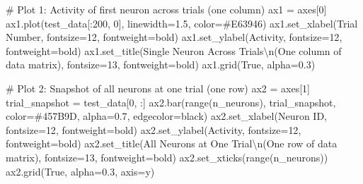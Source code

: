 \documentclass[
  11pt,
  letterpaper,
  oneside,
  openany]{book}
\newenvironment{Shaded}{\begin{snugshade}}{\end{snugshade}}
\newcommand{\BuiltInTok}[1]{\textcolor[rgb]{0.00,0.23,0.31}{#1}}
\newcommand{\CharTok}[1]{\textcolor[rgb]{0.13,0.47,0.30}{#1}}
\newcommand{\CommentTok}[1]{\textcolor[rgb]{0.37,0.37,0.37}{#1}}
\newcommand{\DecValTok}[1]{\textcolor[rgb]{0.68,0.00,0.00}{#1}}
\newcommand{\FloatTok}[1]{\textcolor[rgb]{0.68,0.00,0.00}{#1}}
\newcommand{\NormalTok}[1]{\textcolor[rgb]{0.00,0.23,0.31}{#1}}
\newcommand{\OperatorTok}[1]{\textcolor[rgb]{0.37,0.37,0.37}{#1}}
\newcommand{\StringTok}[1]{\textcolor[rgb]{0.13,0.47,0.30}{#1}}
\newcommand{\VariableTok}[1]{\textcolor[rgb]{0.07,0.07,0.07}{#1}}
\begin{document}
\begin{Shaded}
\begin{Highlighting}[]
\CommentTok{\# Plot 1: Activity of first neuron across trials (one column)}
\NormalTok{ax1 }\OperatorTok{=}\NormalTok{ axes[}\DecValTok{0}\NormalTok{]}
\NormalTok{ax1.plot(test\_data[:}\DecValTok{200}\NormalTok{, }\DecValTok{0}\NormalTok{], linewidth}\OperatorTok{=}\FloatTok{1.5}\NormalTok{, color}\OperatorTok{=}\StringTok{\textquotesingle{}\#E63946\textquotesingle{}}\NormalTok{)}
\NormalTok{ax1.set\_xlabel(}\StringTok{\textquotesingle{}Trial Number\textquotesingle{}}\NormalTok{, fontsize}\OperatorTok{=}\DecValTok{12}\NormalTok{, fontweight}\OperatorTok{=}\StringTok{\textquotesingle{}bold\textquotesingle{}}\NormalTok{)}
\NormalTok{ax1.set\_ylabel(}\StringTok{\textquotesingle{}Activity\textquotesingle{}}\NormalTok{, fontsize}\OperatorTok{=}\DecValTok{12}\NormalTok{, fontweight}\OperatorTok{=}\StringTok{\textquotesingle{}bold\textquotesingle{}}\NormalTok{)}
\NormalTok{ax1.set\_title(}\StringTok{\textquotesingle{}Single Neuron Across Trials}\CharTok{\textbackslash{}n}\StringTok{(One column of data matrix)\textquotesingle{}}\NormalTok{, }
\NormalTok{              fontsize}\OperatorTok{=}\DecValTok{13}\NormalTok{, fontweight}\OperatorTok{=}\StringTok{\textquotesingle{}bold\textquotesingle{}}\NormalTok{)}
\NormalTok{ax1.grid(}\VariableTok{True}\NormalTok{, alpha}\OperatorTok{=}\FloatTok{0.3}\NormalTok{)}

\CommentTok{\# Plot 2: Snapshot of all neurons at one trial (one row)}
\NormalTok{ax2 }\OperatorTok{=}\NormalTok{ axes[}\DecValTok{1}\NormalTok{]}
\NormalTok{trial\_snapshot }\OperatorTok{=}\NormalTok{ test\_data[}\DecValTok{0}\NormalTok{, :]}
\NormalTok{ax2.bar(}\BuiltInTok{range}\NormalTok{(n\_neurons), trial\_snapshot, color}\OperatorTok{=}\StringTok{\textquotesingle{}\#457B9D\textquotesingle{}}\NormalTok{, alpha}\OperatorTok{=}\FloatTok{0.7}\NormalTok{, edgecolor}\OperatorTok{=}\StringTok{\textquotesingle{}black\textquotesingle{}}\NormalTok{)}
\NormalTok{ax2.set\_xlabel(}\StringTok{\textquotesingle{}Neuron ID\textquotesingle{}}\NormalTok{, fontsize}\OperatorTok{=}\DecValTok{12}\NormalTok{, fontweight}\OperatorTok{=}\StringTok{\textquotesingle{}bold\textquotesingle{}}\NormalTok{)}
\NormalTok{ax2.set\_ylabel(}\StringTok{\textquotesingle{}Activity\textquotesingle{}}\NormalTok{, fontsize}\OperatorTok{=}\DecValTok{12}\NormalTok{, fontweight}\OperatorTok{=}\StringTok{\textquotesingle{}bold\textquotesingle{}}\NormalTok{)}
\NormalTok{ax2.set\_title(}\StringTok{\textquotesingle{}All Neurons at One Trial}\CharTok{\textbackslash{}n}\StringTok{(One row of data matrix)\textquotesingle{}}\NormalTok{, }
\NormalTok{              fontsize}\OperatorTok{=}\DecValTok{13}\NormalTok{, fontweight}\OperatorTok{=}\StringTok{\textquotesingle{}bold\textquotesingle{}}\NormalTok{)}
\NormalTok{ax2.set\_xticks(}\BuiltInTok{range}\NormalTok{(n\_neurons))}
\NormalTok{ax2.grid(}\VariableTok{True}\NormalTok{, alpha}\OperatorTok{=}\FloatTok{0.3}\NormalTok{, axis}\OperatorTok{=}\StringTok{\textquotesingle{}y\textquotesingle{}}\NormalTok{)}


\end{Highlighting}
\end{Shaded}
\end{document}
